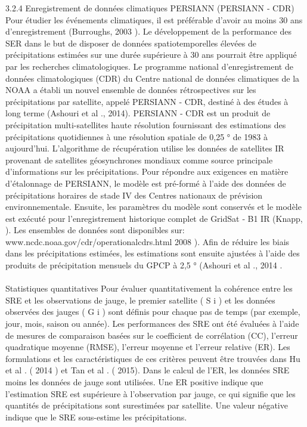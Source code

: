 3.2.4 Enregistrement de données climatiques PERSIANN (PERSIANN ‐ CDR)
Pour étudier les événements climatiques, il est préférable d’avoir au moins 30 ans d’enregistrement (Burroughs, 2003 ). Le développement de la performance des SER dans le but de disposer de données spatiotemporelles élevées de précipitations estimées sur une durée supérieure à 30 ans pourrait être appliqué par les recherches climatologiques. Le programme national d'enregistrement de données climatologiques (CDR) du Centre national de données climatiques de la NOAA a établi un nouvel ensemble de données rétrospectives sur les précipitations par satellite, appelé PERSIANN ‐ CDR, destiné à des études à long terme (Ashouri et al ., 2014). PERSIANN ‐ CDR est un produit de précipitation multi-satellites haute résolution fournissant des estimations des précipitations quotidiennes à une résolution spatiale de 0,25 ° de 1983 à aujourd'hui. L'algorithme de récupération utilise les données de satellites IR provenant de satellites géosynchrones mondiaux comme source principale d'informations sur les précipitations. Pour répondre aux exigences en matière d'étalonnage de PERSIANN, le modèle est pré-formé à l'aide des données de précipitations horaires de stade IV des Centres nationaux de prévision environnementale. Ensuite, les paramètres du modèle sont conservés et le modèle est exécuté pour l’enregistrement historique complet de GridSat ‐ B1 IR (Knapp, ). Les ensembles de données sont disponibles sur: www.ncdc.noaa.gov/cdr/operationalcdrs.html 2008 ). Afin de réduire les biais dans les précipitations estimées, les estimations sont ensuite ajustées à l'aide des produits de précipitation mensuels du GPCP à 2,5 ° (Ashouri et al ., 2014 .\\ \ \\
Statistiques quantitatives
Pour évaluer quantitativement la cohérence entre les SRE et les observations de jauge, le premier satellite ( S i ) et les données observées des jauges ( G i ) sont définis pour chaque pas de temps (par exemple, jour, mois, saison ou année). Les performances des SRE ont été évaluées à l'aide de mesures de comparaison basées sur le coefficient de corrélation (CC), l'erreur quadratique moyenne (RMSE), l'erreur moyenne et l'erreur relative (ER). Les formulations et les caractéristiques de ces critères peuvent être trouvées dans Hu et al . ( 2014 ) et Tan et al . ( 2015). Dans le calcul de l'ER, les données SRE moins les données de jauge sont utilisées. Une ER positive indique que l'estimation SRE est supérieure à l'observation par jauge, ce qui signifie que les quantités de précipitations sont surestimées par satellite. Une valeur négative indique que le SRE sous-estime les précipitations.\\ \ \\
